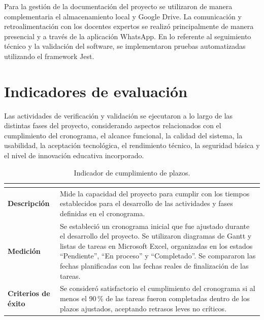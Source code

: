 Para la gestión de la documentación del proyecto se utilizaron de manera complementaria el almacenamiento local y Google Drive. La comunicación y retroalimentación con los docentes expertos se realizó principalmente de manera presencial y a través de la aplicación WhatsApp. En lo referente al seguimiento técnico y la validación del software, se implementaron pruebas automatizadas utilizando el framework Jest.

\section{Indicadores de evaluación}

Las actividades de verificación y validación se ejecutaron a lo largo de las distintas fases del proyecto, considerando aspectos relacionados con el cumplimiento del cronograma, el alcance funcional, la calidad del sistema, la usabilidad, la aceptación tecnológica, el rendimiento técnico, la seguridad básica y el nivel de innovación educativa incorporado.

\newcommand{\indicadortable}[4]{%
\begin{table}[H]
\centering
\caption{#1.}
\label{#2}
\footnotesize
\renewcommand{\arraystretch}{1.25}
\begin{tabularx}{\textwidth}{|>{\bfseries}p{3cm}|X|}
\hline
\rowcolor{headblue}\multicolumn{2}{|c|}{\textbf{#3}}\\\hline
Descripción & #4 \\\hline
\end{tabularx}
\end{table}
}

\begin{table}[H]
\centering
\caption{Indicador de cumplimiento de plazos.}
\label{tab:ind_plazos}
\footnotesize
\renewcommand{\arraystretch}{1.25}
\begin{tabularx}{\textwidth}{|>{\bfseries}p{3.2cm}|X|}
\hline
\rowcolor{headblue}\multicolumn{2}{|c|}{\textbf{Cumplimiento de plazos}}\\\hline
Descripción & Mide la capacidad del proyecto para cumplir con los tiempos establecidos para el desarrollo de las actividades y fases definidas en el cronograma. \\\hline
Medición & Se estableció un cronograma inicial que fue ajustado durante el desarrollo del proyecto. Se utilizaron diagramas de Gantt y listas de tareas en Microsoft Excel, organizadas en los estados ``Pendiente'', ``En proceso'' y ``Completado''. Se compararon las fechas planificadas con las fechas reales de finalización de las tareas. \\\hline
Criterios de éxito & Se consideró satisfactorio el cumplimiento del cronograma si al menos el 90\,\% de las tareas fueron completadas dentro de los plazos ajustados, aceptando retrasos leves no críticos. \\\hline
\end{tabularx}
\end{table}
\elaboracion

